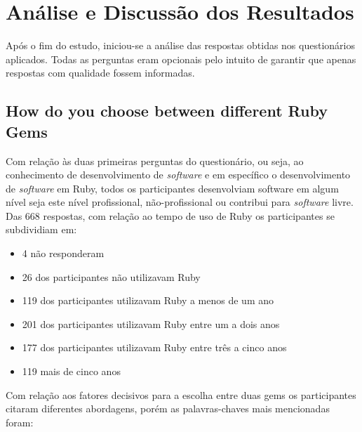 \chapter{Análise e Discussão dos Resultados}

Após o fim do estudo, iniciou-se a análise das respostas obtidas nos questionários aplicados. Todas as perguntas eram opcionais pelo intuito de garantir que apenas respostas com qualidade fossem informadas.

\section{How do you choose between different Ruby Gems}

Com relação às duas primeiras perguntas do questionário, ou seja, ao conhecimento de desenvolvimento de \textit{software} e em específico o desenvolvimento de \textit{software} em Ruby, todos os participantes desenvolviam software em algum nível seja este nível profissional, não-profissional ou contribui para \textit{software} livre. Das 668 respostas, com relação ao tempo de uso de Ruby os participantes se subdividiam em:

\begin{itemize}
	\item 4 não responderam
	\item 26 dos participantes não utilizavam Ruby
    \item 119 dos participantes utilizavam Ruby a menos de um ano
    \item 201 dos participantes utilizavam Ruby entre um a dois anos
    \item 177 dos participantes utilizavam Ruby entre três a cinco anos
    \item 119 mais de cinco anos
\end{itemize}

Com relação aos fatores decisivos para a escolha entre duas gems os participantes citaram diferentes abordagens, porém as palavras-chaves mais mencionadas foram:

